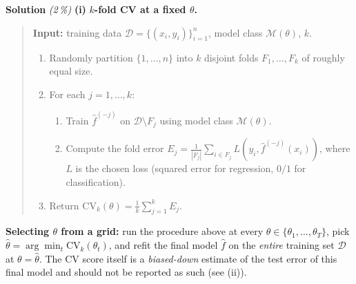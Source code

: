 \documentclass[11pt,a4paper]{article}
\newcommand{\subpoints}[1]{\textit{(#1\,\%)}}
\newcommand{\sol}{\noindent\textbf{Solution}}
\begin{document}
\sol{} \subpoints{2} \textbf{(i)} \textbf{$k$-fold CV at a fixed $\theta$.}
\begin{quote}\small
\textbf{Input:} training data $\mathcal D = \{(x_i, y_i)\}_{i=1}^n$, model class $\mathcal M(\theta)$, $k$.
\begin{enumerate}
  \item Randomly partition $\{1,\dots,n\}$ into $k$ disjoint folds $F_1, \dots, F_k$ of roughly
        equal size.
  \item For each $j = 1, \dots, k$:
    \begin{enumerate}
      \item Train $\hat f^{(-j)}$ on $\mathcal D \setminus F_j$ using model class $\mathcal M(\theta)$.
      \item Compute the fold error
            $E_j = \tfrac{1}{|F_j|}\sum_{i\in F_j} L(y_i, \hat f^{(-j)}(x_i))$,
            where $L$ is the chosen loss (squared error for regression, $0/1$ for classification).
    \end{enumerate}
  \item Return $\mathrm{CV}_k(\theta) = \tfrac{1}{k}\sum_{j=1}^k E_j$.
\end{enumerate}
\end{quote}
\textbf{Selecting $\theta$ from a grid:} run the procedure above at every
$\theta\in\{\theta_1,\dots,\theta_T\}$, pick $\hat\theta = \arg\min_t \mathrm{CV}_k(\theta_t)$, and
refit the final model $\hat f$ on the \emph{entire} training set $\mathcal D$ at $\theta=\hat\theta$.
The CV score itself is a \emph{biased-down} estimate of the test error of this final model and
should not be reported as such (see (ii)).
\end{document}
